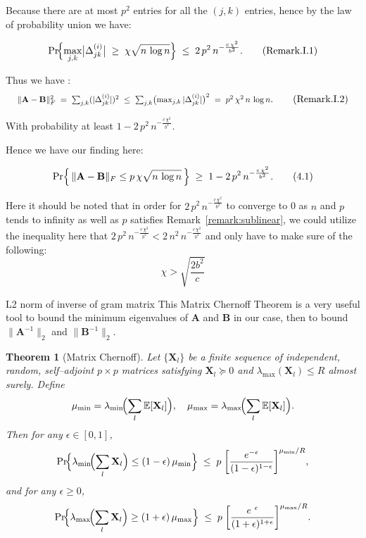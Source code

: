 \documentclass{beamer}
\newtheorem{thm}{Theorem}
\theoremstyle{remark}
\begin{document}
\begin{frame}
\small
Because there are at most $p^{2}$ entries for all the $(j,k)$ entries, hence by the law of probability union we have:

\[
\Pr\!\Bigl\{\max_{j,k}\bigl|\Delta_{jk}^{(i)}\bigr|\;\ge\;\chi\sqrt{n\,\log n}\Bigr\}
\;\le\;
2\,p^{2}\,n^{-\frac{c\,\chi^{2}}{b^{2}}}.\tag{Remark.I.1}\label{eq:Remark.I.1}
\]

Thus we have :
\[
\scalebox{0.85}{$
\|\mathbf{A} - \mathbf{B}\|_{F}^{2}
\;=\;
\sum_{j,k}(|\Delta_{jk}^{(i)}|)^{2}
\;\le\;
\sum_{j,k}\bigl(\max_{j,k}|\Delta_{jk}^{(i)}|\bigr)^{2}
\;=\;
p^{2}\,\chi^2\,n\,\log n
$}.\tag{Remark.I.2}\label{eq:Remark.I.2}
\]

With probability at least $1 - 2\,p^{2}\,n^{-\frac{c\,\chi^{2}}{b^{2}}}$.

Hence we have our finding here:

\[
\Pr\Bigl\{\,\|\mathbf{A} - \mathbf{B}\|_{F} \leq p\,\chi\sqrt{n\,\log n}\,\Bigr\}
\;\ge\;
1 - 2\,p^{2}\,n^{-\frac{c\,\chi^{2}}{b^{2}}}. \tag{4.1}\label{eq:4.1}
\]

Here it should be noted that in order for $2\,p^{2}\,n^{-\frac{c\,\chi^{2}}{b^{2}}}$ to converge to 0 as $n$ and $p$ tends to infinity as well as $p$ satisfies Remark~\ref{remark:sublinear},
we could utilize the inequality here that $2\,p^{2}\,n^{-\frac{c\,\chi^{2}}{b^{2}}} < 2\,n^{2}\,n^{-\frac{c\,\chi^{2}}{b^{2}}}$ and only have to make sure of the following:
\[
\chi > \sqrt{\frac{2 b^2}{c}}\tag{Remark.I.3}\label{eq:Remark.I.3}
\]
\normalsize
\end{frame}
\begin{frame}[fragile]{L2 norm of inverse of gram matrix}
\footnotesize %
This Matrix Chernoff Theorem is a very useful tool to bound the minimum eigenvalues of \(\mathbf{A}\) and \(\mathbf{B}\) in our case, then to bound \(\|\mathbf{A}^{-1}\|_{2}\) and \(\|\mathbf{B}^{-1}\|_{2}\).
\begin{thm}[Matrix Chernoff]
    \label{thm:chernoff}
    Let \(\{\mathbf X_l\}\) be a finite sequence of independent, random,
        self–adjoint \(p\times p\) matrices satisfying
        \(\mathbf X_l\succeq0\) and \(\lambda_{\max}(\mathbf X_l)\le R\)
        almost surely.  Define
        \[
        \mu_{\min}
            =\lambda_{\min}\!\Bigl(\sum_l\mathbb E[\mathbf X_l]\Bigr),
        \quad
        \mu_{\max}
            =\lambda_{\max}\!\Bigl(\sum_l\mathbb E[\mathbf X_l]\Bigr).
        \]
        Then for any \(\epsilon\in[0,1]\),
        \[
        \Pr\!\Bigl\{
            \lambda_{\min}\!\Bigl(\sum_l\mathbf X_l\Bigr)\le (1-\epsilon)\,\mu_{\min}
        \Bigr\}
        \;\le\;
        p\;\biggl[\frac{e^{-\epsilon}}{(1-\epsilon)^{1-\epsilon}}\biggr]^{\mu_{\min}/R},
        \]
        and for any \(\epsilon\ge0\),
        \[
        \Pr\!\Bigl\{
            \lambda_{\max}\!\Bigl(\sum_l\mathbf X_l\Bigr)\ge (1+\epsilon)\,\mu_{\max}
        \Bigr\}
        \;\le\;
        p\;\biggl[\frac{e^{\ \epsilon}}{(1+\epsilon)^{1+\epsilon}}\biggr]^{\mu_{\max}/R}.
        \]
\end{thm}
\end{frame}
\end{document}
